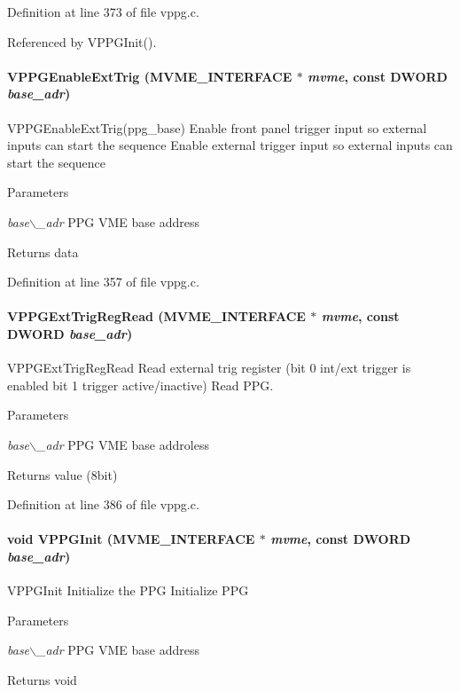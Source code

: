 Definition at line 373 of file vppg.c.

Referenced by VPPGInit().
\paragraph[{VPPGEnableExtTrig}]{ VPPGEnableExtTrig ({\bf MVME\_\-INTERFACE} $\ast$ {\em mvme}, \/  const {\bf DWORD} {\em base\_\-adr})}\hfill\label{vppg_8c_ad4f1d654e1523b2adb0a8007a4eedbef}
VPPGEnableExtTrig(ppg\_\-base) Enable front panel trigger input so external inputs can start the sequence  Enable external trigger input so external inputs can start the sequence 
\begin{DoxyParams}{Parameters}
\item[{\em base$\backslash$\_\-adr}]PPG VME base address \end{DoxyParams}
\begin{DoxyReturn}{Returns}
data 
\end{DoxyReturn}


Definition at line 357 of file vppg.c.
\paragraph[{VPPGExtTrigRegRead}]{ VPPGExtTrigRegRead ({\bf MVME\_\-INTERFACE} $\ast$ {\em mvme}, \/  const {\bf DWORD} {\em base\_\-adr})}\hfill\label{vppg_8c_a39c304959840cd2c1a0812a4c6ac0ee6}
VPPGExtTrigRegRead Read external trig register (bit 0 int/ext trigger is enabled bit 1 trigger active/inactive)  Read PPG. 
\begin{DoxyParams}{Parameters}
\item[{\em base$\backslash$\_\-adr}]PPG VME base addroless \end{DoxyParams}
\begin{DoxyReturn}{Returns}
value (8bit) 
\end{DoxyReturn}


Definition at line 386 of file vppg.c.
\paragraph[{VPPGInit}]{\setlength{\rightskip}{0pt plus 5cm}void VPPGInit ({\bf MVME\_\-INTERFACE} $\ast$ {\em mvme}, \/  const {\bf DWORD} {\em base\_\-adr})}\hfill\label{vppg_8c_a379092e6b2de168766f8773009f75f2b}
VPPGInit Initialize the PPG  Initialize PPG 
\begin{DoxyParams}{Parameters}
\item[{\em base$\backslash$\_\-adr}]PPG VME base address \end{DoxyParams}
\begin{DoxyReturn}{Returns}
void 
\end{DoxyReturn}


